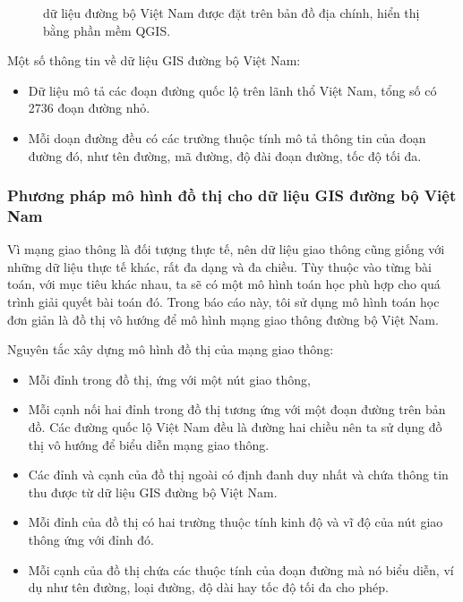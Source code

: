 \documentclass[14pt, oneside, a4paper, openany]{scrartcl}
\begin{document}
\begin{figure}
\begin{minipage}{0.7\textwidth}
		\caption[Dữ liệu đường bộ Việt Nam được đặt trên bản đồ địa chính]{dữ liệu đường bộ Việt Nam được đặt trên bản đồ địa chính, hiển thị bằng phần mềm QGIS.}
		\label{fig:vnhighway02}
	\end{minipage}
\end{figure}

Một số thông tin về dữ liệu GIS đường bộ Việt Nam:
\begin{itemize}
	\item Dữ liệu mô tả các đoạn đường quốc lộ trên lãnh thổ Việt Nam, tổng số có 2736 đoạn đường nhỏ.
	\item Mỗi doạn đường đều có các trường thuộc tính mô tả thông tin của đoạn đường đó, như tên đường, mã đường, độ đài đoạn đường, tốc độ tối đa.
\end{itemize}

\subsubsection{Phương pháp mô hình đồ thị cho dữ liệu GIS đường bộ Việt Nam}
Vì mạng giao thông là đối tượng thực tế, nên dữ liệu giao thông cũng giống với những dữ liệu thực tế khác, rất đa dạng và đa chiều. 
Tùy thuộc vào từng bài toán, với mục tiêu khác nhau, ta sẽ có một mô hình toán học phù hợp cho quá trình giải quyết bài toán đó.
Trong báo cáo này, tôi sử dụng mô hình toán học đơn giản là đồ thị vô hướng để mô hình mạng giao thông đường bộ Việt Nam. 

Nguyên tắc xây dựng mô hình đồ thị của mạng giao thông:
\begin{itemize}
	\item Mỗi đỉnh trong đồ thị, ứng với một nút giao thông,
	\item Mỗi cạnh nối hai đỉnh trong đồ thị tương ứng với một đoạn đường trên bản đồ. Các đường quốc lộ Việt Nam đều là đường hai chiều nên ta sử dụng đồ thị vô hướng để biểu diễn mạng giao thông.
	\item Các đỉnh và cạnh của đồ thị ngoài có định đanh duy nhất và chứa thông tin thu được từ dữ liệu GIS đường bộ Việt Nam.
	\item Mỗi đỉnh của đồ thị có hai trường thuộc tính kinh độ và vĩ độ của nút giao thông ứng với đỉnh đó.
	\item Mỗi cạnh của đồ thị chứa các thuộc tính của đoạn đường mà nó biểu diễn, ví dụ như tên đường, loại đường, độ dài hay tốc độ tối đa cho phép.
\end{itemize}
\end{document}
